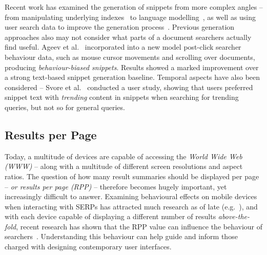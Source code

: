 Recent work has examined the generation of snippets from more complex angles -- from manipulating underlying indexes~\cite{turpin2007fast_snippets, bast2014snippet_generation} to language modelling~\cite{li2010snippet_extraction, he2012bridging}, as well as using user search data to improve the generation process~\cite{ageev2013summaries, savenkov2011search}. Previous generation approaches also may not consider what parts of a document searchers actually find useful. Ageev et al.~\cite{ageev2013summaries} incorporated into a new model post-click searcher behaviour data, such as mouse cursor movements and scrolling over documents, producing \emph{behaviour-biased snippets}. Results showed a marked improvement over a strong text-based snippet generation baseline. Temporal aspects have also been considered -- Svore et al.~\cite{svore2012temporal_snippets} conducted a user study, showing that users preferred snippet text with \emph{trending} content in snippets when searching for trending queries, but not so for general queries.





\vspace{-1.5mm}
\subsection{Results per Page}
Today, a multitude of devices are capable of accessing the \emph{World Wide Web (WWW)} -- along with a multitude of different screen resolutions and aspect ratios. The question of how many result summaries should be displayed per page -- \emph{or results per page (RPP)} -- therefore becomes hugely important, yet increasingly difficult to answer. Examining behavioural effects on mobile devices when interacting with SERPs has attracted much research as of late (e.g.~\cite{kim2012small_vs_large, kim2014eye_tracking, kim2016pagination_versus_scrolling}), and with each device capable of displaying a different number of results \emph{above-the-fold}, recent research has shown that the RPP value can influence the behaviour of searchers~\cite{joachims2005clickdata, kim2014eye_tracking}. Understanding this behaviour can help guide and inform those charged with designing contemporary user interfaces.

